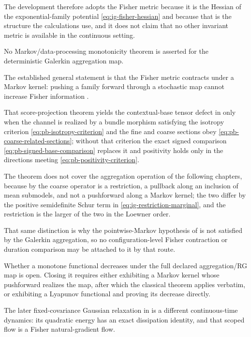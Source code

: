 The development therefore adopts the Fisher metric because it is the Hessian of the exponential-family potential \eqref{eq:ig-fisher-hessian} and because that is the structure the calculations use, and it does not claim that no other invariant metric is available in the continuous setting. 

No Markov/data-processing monotonicity theorem is asserted for the deterministic
Galerkin aggregation map. 

The established general statement is that the Fisher
metric contracts under a Markov kernel: pushing a family forward through a
stochastic map cannot increase Fisher information
\citep{AmariNagaoka2000,AyJostLeSchwachhofer2017}. 

That
score-projection theorem yields the contextual-base tensor defect in
 only when the channel is realized by a
bundle morphism satisfying the isotropy criterion
\eqref{eq:pb-isotropy-criterion} and the fine and coarse sections
obey \eqref{eq:pb-coarse-related-sections}; without that criterion the exact
signed comparison \eqref{eq:pb-signed-base-comparison} replaces it and
positivity holds only in the directions meeting
\eqref{eq:pb-positivity-criterion}. 

The
theorem does not cover the aggregation operation of the following chapters,
because by  the coarse operator is a
restriction, a pullback along an inclusion of mean submodels, and not a
pushforward along a Markov kernel; the two differ by the positive semidefinite
Schur term in \eqref{eq:ig-restriction-marginal}, and the restriction is the
larger of the two in the Loewner order. 

That same
distinction is why the pointwise-Markov hypothesis of
 is not satisfied by the Galerkin
aggregation, so no configuration-level Fisher contraction or duration
comparison may be attached to it by that route. 

Whether a monotone functional decreases
under the full declared aggregation/RG map is open. Closing it requires either
exhibiting a Markov kernel whose pushforward realizes the map, after which the
classical theorem applies verbatim, or exhibiting a Lyapunov functional and
proving its decrease directly. 

The later fixed-covariance Gaussian relaxation
in  is a different continuous-time
dynamics: its quadratic energy has an exact dissipation identity, and that
scoped flow is a Fisher natural-gradient flow. 

